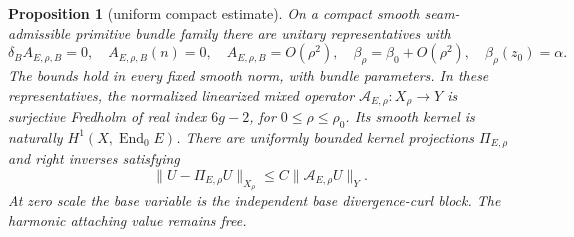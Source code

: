 \documentclass[11pt]{amsart}
\newtheorem{proposition}[theorem]{Proposition}
\theoremstyle{definition}
\theoremstyle{remark}
\theoremstyle{plain}
\newcommand{\End}{\operatorname{End}}
\begin{document}
\begin{proposition}[uniform compact estimate]
\label{prop:compact-fractional-inverse}
On a compact smooth seam-admissible primitive bundle family there
are unitary representatives with
\begin{equation}\label{eq:compact-base-gauge}
 \delta_B A_{E,\rho,B}=0,\quad A_{E,\rho,B}(n)=0,\quad
 A_{E,\rho,B}=O(\rho^2),\quad
 \beta_\rho=\beta_0+O(\rho^2),\quad \beta_\rho(z_0)=\alpha.
\end{equation}
The bounds hold in every fixed smooth norm, with bundle parameters.
In these representatives, the normalized linearized mixed operator
$\mathcal A_{E,\rho}:X_\rho\to Y$ is surjective Fredholm of
real index $6g-2$, for $0\leq\rho\leq\rho_0$. Its smooth kernel
is naturally $H^1(X,\End_0E)$. There are uniformly bounded kernel
projections $\Pi_{E,\rho}$ and right inverses satisfying
\begin{equation}\label{eq:compact-fractional-inverse}
 \|U-\Pi_{E,\rho}U\|_{X_\rho}
                    \leq C\|\mathcal A_{E,\rho}U\|_Y.
\end{equation}
At zero scale the base variable is the independent base
divergence-curl block. The harmonic attaching value remains free.
\end{proposition}
\end{document}
